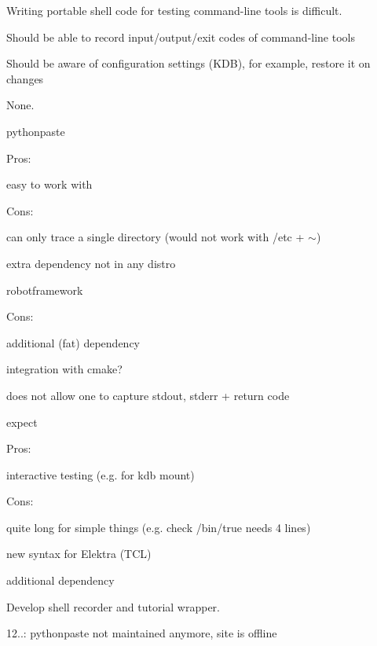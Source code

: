 Writing portable shell code for testing command-\/line tools is difficult.


\begin{DoxyItemize}
\item Should be able to record input/output/exit codes of command-\/line tools
\item Should be aware of configuration settings (K\+DB), for example, restore it on changes
\end{DoxyItemize}

None.


\begin{DoxyItemize}
\item pythonpaste
\begin{DoxyItemize}
\item Pros\+:
\begin{DoxyItemize}
\item easy to work with
\end{DoxyItemize}
\item Cons\+:
\begin{DoxyItemize}
\item can only trace a single directory (would not work with /etc + $\sim$)
\item extra dependency not in any distro
\end{DoxyItemize}
\end{DoxyItemize}
\item robotframework
\begin{DoxyItemize}
\item Cons\+:
\begin{DoxyItemize}
\item additional (fat) dependency
\item integration with cmake?
\item does not allow one to capture stdout, stderr + return code
\end{DoxyItemize}
\end{DoxyItemize}
\item expect
\begin{DoxyItemize}
\item Pros\+:
\begin{DoxyItemize}
\item interactive testing (e.\+g. for kdb mount)
\end{DoxyItemize}
\item Cons\+:
\begin{DoxyItemize}
\item quite long for simple things (e.\+g. check /bin/true needs 4 lines)
\item new syntax for Elektra (T\+CL)
\item additional dependency
\end{DoxyItemize}
\end{DoxyItemize}
\end{DoxyItemize}

Develop shell recorder and tutorial wrapper.


\begin{DoxyItemize}
\item 12..\+: pythonpaste not maintained anymore, site is offline 
\end{DoxyItemize}